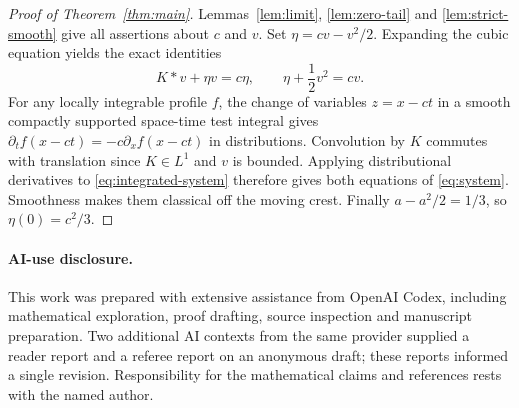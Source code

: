 \documentclass[11pt,a4paper]{article}
\theoremstyle{remark}
\begin{document}
\begin{proof}[Proof of Theorem~\ref{thm:main}]
Lemmas~\ref{lem:limit}, \ref{lem:zero-tail} and
\ref{lem:strict-smooth} give all assertions about $c$ and $v$.
Set $\eta=cv-v^2/2$. Expanding the cubic equation yields the exact
identities
\begin{equation}\label{eq:integrated-system}
 K*v+\eta v=c\eta,\qquad \eta+\frac12v^2=cv.
\end{equation}
For any locally integrable profile $f$, the change of variables $z=x-ct$
in a smooth compactly supported space-time test integral gives
$\partial_t f(x-ct)=-c\partial_x f(x-ct)$ in distributions.
Convolution by $K$ commutes with translation since $K\in L^1$ and $v$
is bounded. Applying distributional derivatives to
\eqref{eq:integrated-system} therefore gives both equations of
\eqref{eq:system}. Smoothness makes them classical off the moving crest.
Finally $a-a^2/2=1/3$, so $\eta(0)=c^2/3$.
\end{proof}

\paragraph{AI-use disclosure.}
This work was prepared with extensive assistance from OpenAI Codex,
including mathematical exploration, proof drafting, source inspection and
manuscript preparation. Two additional AI contexts from the same provider
supplied a reader report and a referee report on an anonymous draft; these
reports informed a single revision. Responsibility for the mathematical claims and
references rests with the named author.
\end{document}
